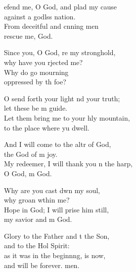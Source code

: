 \begin{psalmverse}
  \begin{patverse}
    efend me, O God, and plad my cause\Med\\
against a godlss nation.\\
From deceitful and cnning men\Med\\
rescue me,  God.

Since you, O God, re my stronghold,\Med\\
why have you rjected me?\\
Why do  go mourning\Med\\
oppressed by th foe?

O send forth your light nd your truth;\Med\\
let these be m guide.\\
Let them bring me to your hly mountain,\Med\\
to the place where yu dwell.

And I will come to the altr of God,\Med\\
the God of m joy.\\
My redeemer, I will thank you n the harp,\Med\\
O God, m God.

Why are you cast dwn my soul,\Med\\
why groan w\pointup{\i}thin me?\\
Hope in God; I will prise him still,\Med\\
my savior and m God.

Glory to the Father and t the Son,\Med\\
and to the Hol Spirit:\\
as it was in the beginn\pointup{\i}ng, is now,\Med\\
and will be forever. men.
  \end{patverse}
\end{psalmverse}
